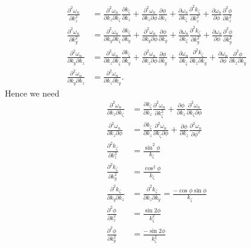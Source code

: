 \documentclass{article}
\begin{document}
\begin{align}
\frac{\partial^2 \omega_{n}}{\partial k_{z}^2} &= \frac{\partial^2 \omega_{n}}{\partial k_{z} \partial k_{\zeta}} \frac{\partial k_{\zeta}}{\partial k_{z}} + \frac{\partial^2 \omega_{n}}{\partial k_{z} \partial \phi} \frac{\partial \phi}{\partial k_{z}} + \frac{\partial \omega_{n}}{\partial k_{\zeta}} \frac{\partial^2 k_{\zeta}}{\partial k_{z}^2} + \frac{\partial \omega_{n}}{\partial \phi} \frac{\partial^2 \phi}{\partial k_{z}^2} \\
\frac{\partial^2 \omega_{n}}{\partial k_{y}^2} &= \frac{\partial^2 \omega_{n}}{\partial k_{y} \partial k_{\zeta}} \frac{\partial k_{\zeta}}{\partial k_{y}} + \frac{\partial^2 \omega_{n}}{\partial k_{y} \partial \phi} \frac{\partial \phi}{\partial k_{y}} + \frac{\partial \omega_{n}}{\partial k_{\zeta}} \frac{\partial^2 k_{\zeta}}{\partial k_{y}^2} + \frac{\partial \omega_{n}}{\partial \phi} \frac{\partial^2 \phi}{\partial k_{y}^2} \\
\frac{\partial^2 \omega_{n}}{\partial k_{y} \partial k_{z}} &= \frac{\partial^2 \omega_{n}}{\partial k_{z} \partial k_{\zeta}} \frac{\partial k_{\zeta}}{\partial k_{y}} + \frac{\partial^2 \omega_{n}}{\partial k_{z} \partial \phi} \frac{\partial \phi}{\partial k_{y}} + \frac{\partial \omega_{n}}{\partial k_{\zeta}} \frac{\partial^2 k_{\zeta}}{\partial k_{z} \partial k_{y}} + \frac{\partial \omega_{n}}{\partial \phi} \frac{\partial^2 \phi}{\partial k_{z} \partial k_{y}} \\
\frac{\partial^2 \omega_{n}}{\partial k_{y} \partial k_{z}} &= \frac{\partial^2 \omega_{n}}{\partial k_{z} \partial k_{y}}.
\end{align}
Hence we need
\begin{align}
\frac{\partial^2 \omega_{n}}{\partial k_{z} \partial k_{\zeta}} &= \frac{\partial k_{\zeta}}{\partial k_{z}} \frac{\partial^2 \omega_{n}}{\partial k_{\zeta}^2} + \frac{\partial \phi}{\partial k_{z}} \frac{\partial^2 \omega_{n}}{\partial k_{\zeta} \partial \phi} \\
\frac{\partial^2 \omega_{n}}{\partial k_{z} \partial \phi} &= \frac{\partial k_{\zeta}}{\partial k_{z}} \frac{\partial^2 \omega_{n}}{\partial k_{\zeta} \partial \phi} + \frac{\partial \phi}{\partial k_{z}} \frac{\partial^2 \omega_{n}}{\partial \phi^2} \\
\frac{\partial^2 k_{\zeta}}{\partial k_{z}^2} &= \frac{\sin^2{\phi}}{k_{\zeta}} \\
\frac{\partial^2 k_{\zeta}}{\partial k_{y}^2} &= \frac{\cos^2{\phi}}{k_{\zeta}} \\
\frac{\partial^2 k_{\zeta}}{\partial k_{y} \partial k_{z}} &= \frac{\partial^2 k_{\zeta}}{\partial k_{z} \partial k_{y}} = \frac{-\cos{\phi} \sin{\phi}}{k_{\zeta}} \\
\frac{\partial^2 \phi}{\partial k_{z}^2} &= \frac{\sin{2 \phi}}{k_{\zeta}^2} \\
\frac{\partial^2 \phi}{\partial k_{y}^2} &= \frac{-\sin{2 \phi}}{k_{\zeta}^2}
\end{align}
\end{document}
